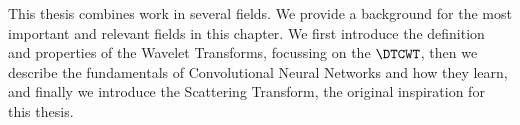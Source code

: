 This thesis combines work in several fields. We provide a background for the
most important and relevant fields in this chapter. We first introduce the
definition and properties of the Wavelet Transforms, focussing on the $\DTCWT$,
then we describe the fundamentals of Convolutional Neural Networks and how they
learn, and finally we introduce the Scattering Transform, the original
inspiration for this thesis.
